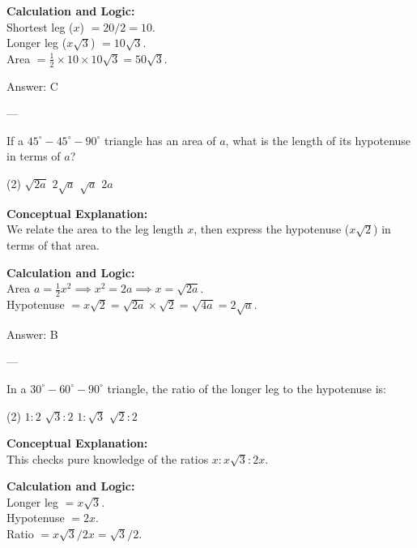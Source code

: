 \documentclass[11pt,paper=a4,answers]{exam}
\begin{document}
\begin{questions}
\begin{solution}
\vspace{10pt}
\textbf{Calculation and Logic:} \\
Shortest leg ($x$) $= 20 / 2 = 10$. \\
Longer leg ($x\sqrt{3}$) $= 10\sqrt{3}$. \\
Area $= \frac{1}{2} \times 10 \times 10\sqrt{3} = 50\sqrt{3}$.

\vspace{15pt}
Answer: \colorbox{yellow!100}{C}
\end{solution}

---

\question
If a $45^\circ-45^\circ-90^\circ$ triangle has an area of $a$, what is the length of its hypotenuse in terms of $a$?
\begin{tasks}(2)
    \task $\sqrt{2a}$
    \task $2\sqrt{a}$
    \task $\sqrt{a}$
    \task $2a$
\end{tasks}

\begin{solution}
\textbf{Conceptual Explanation:} \\
We relate the area to the leg length $x$, then express the hypotenuse ($x\sqrt{2}$) in terms of that area.

\vspace{10pt}
\textbf{Calculation and Logic:} \\
Area $a = \frac{1}{2}x^2 \implies x^2 = 2a \implies x = \sqrt{2a}$. \\
Hypotenuse $= x\sqrt{2} = \sqrt{2a} \times \sqrt{2} = \sqrt{4a} = 2\sqrt{a}$.

\vspace{15pt}
Answer: \colorbox{yellow!100}{B}
\end{solution}

---

\question
In a $30^\circ-60^\circ-90^\circ$ triangle, the ratio of the longer leg to the hypotenuse is:
\begin{tasks}(2)
    \task $1 : 2$
    \task $\sqrt{3} : 2$
    \task $1 : \sqrt{3}$
    \task $\sqrt{2} : 2$
\end{tasks}

\begin{solution}
\textbf{Conceptual Explanation:} \\
This checks pure knowledge of the ratios $x : x\sqrt{3} : 2x$.

\vspace{10pt}
\textbf{Calculation and Logic:} \\
Longer leg $= x\sqrt{3}$. \\
Hypotenuse $= 2x$. \\
Ratio $= x\sqrt{3} / 2x = \sqrt{3} / 2$.


\end{solution}
\end{questions}
\end{document}

